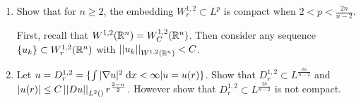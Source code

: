 \begin{enumerate}
\item Show that for $n \geq 2$, the embedding $W_r^{1, 2} \subset L^p$ is compact when $2 < p < \frac{2 n}{n - 2}$.

  First, recall that $W^{1, 2}(\mathbb{R}^n) = W_C^{1, 2}(\mathbb{R}^n)$.
  Then consider any sequence $\{ u_k \} \subset W_r^{1, 2}(\mathbb{R}^n)$ with $\left|\left|u_k\right|\right|_{W^{1, 2}(\mathbb{R}^n)} < C$.

\item Let $u = D_r^{1, 2} = \{ \int |\nabla u|^2 \;\mathrm{d}x < \infty | u = u(r) \}$.
  Show that $D_r^{1, 2} \subset L^{\frac{2 n}{n - 2}}$ and $|u(r)| \leq C \left|\left|D u\right|\right|_{L^{2}()} r^{\frac{2 - n}{2}}$.
  However show that $D_r^{1, 2} \subset L^{\frac{2 n}{n - 2}}$ is not compact.

\end{enumerate}

